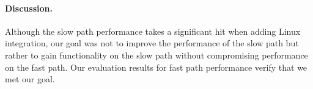 \paragraph{Discussion.} Although the slow path performance takes a significant
hit when adding Linux integration, our goal was not to improve the performance of
the slow path but rather to gain functionality on the slow path without
compromising performance on the fast path. Our evaluation results for fast path
performance verify that we met our goal.

